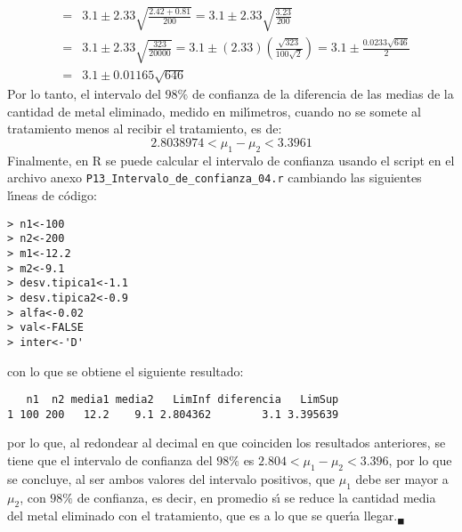 \begin{solucion}
\begin{eqnarray*}
  & = & 3.1 \pm 2.33\sqrt{\frac{2.42 + 0.81}{200}} = 3.1\pm 2.33\sqrt{\frac{3.23}{200}} \\
  & = & 3.1 \pm 2.33\sqrt{\frac{323}{20000}} = 3.1 \pm (2.33)\left( \frac{\sqrt{323}}{100\sqrt{2}} \right) = 3.1 \pm \frac{0.0233\sqrt{646}}{2} \\
  & = & 3.1 \pm 0.01165\sqrt{646}
 \end{eqnarray*}
 Por lo tanto, el intervalo del $98\%$ de confianza de la diferencia de las medias de la cantidad de metal eliminado, medido en mil\'{\i}metros, cuando no se somete al tratamiento menos al recibir el tratamiento, es de:
 \begin{equation*}
  2.8038974 < \mu_1 - \mu_2 < 3.3961
 \end{equation*}
 Finalmente, en R se puede calcular el intervalo de confianza usando el script en el archivo anexo \texttt{P13\_Intervalo\_de\_confianza\_04.r} cambiando las siguientes l\'{\i}neas de c\'odigo:
 \begin{verbatim}
> n1<-100
> n2<-200
> m1<-12.2
> m2<-9.1
> desv.tipica1<-1.1
> desv.tipica2<-0.9
> alfa<-0.02
> val<-FALSE
> inter<-'D'
 \end{verbatim}
 \vspace{-0.5cm}
 con lo que se obtiene el siguiente resultado:
 \begin{verbatim}
   n1  n2 media1 media2   LimInf diferencia   LimSup
1 100 200   12.2    9.1 2.804362        3.1 3.395639
 \end{verbatim}
 \vspace{-0.5cm}
 por lo que, al redondear al decimal en que coinciden los resultados anteriores, se tiene que el intervalo de confianza del $98\%$ es $2.804 < \mu_1 - \mu_2 < 3.396$, por lo que se concluye, al ser ambos valores del intervalo positivos, que $\mu_1$ debe ser mayor a $\mu_2$, con $98\%$ de confianza, es decir, en promedio s\'{\i} se reduce la cantidad media del metal eliminado con el tratamiento, que es a lo que se quer\'{\i}a llegar.${}_{\blacksquare}$
\end{solucion}
